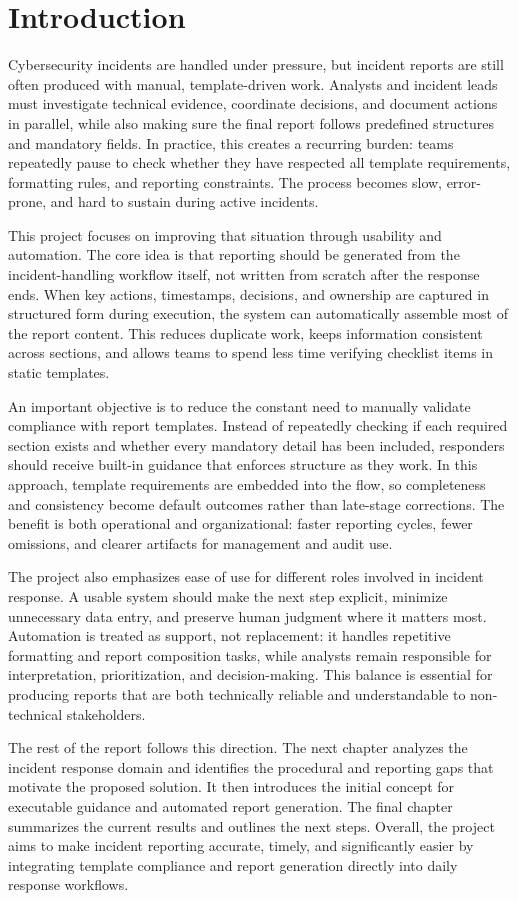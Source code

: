 \chapter*{Introduction}
{}

Cybersecurity incidents are handled under pressure, but incident reports are still often produced with manual, template-driven work. Analysts and incident leads must investigate technical evidence, coordinate decisions, and document actions in parallel, while also making sure the final report follows predefined structures and mandatory fields. In practice, this creates a recurring burden: teams repeatedly pause to check whether they have respected all template requirements, formatting rules, and reporting constraints. The process becomes slow, error-prone, and hard to sustain during active incidents.

This project focuses on improving that situation through usability and automation. The core idea is that reporting should be generated from the incident-handling workflow itself, not written from scratch after the response ends. When key actions, timestamps, decisions, and ownership are captured in structured form during execution, the system can automatically assemble most of the report content. This reduces duplicate work, keeps information consistent across sections, and allows teams to spend less time verifying checklist items in static templates.

An important objective is to reduce the constant need to manually validate compliance with report templates. Instead of repeatedly checking if each required section exists and whether every mandatory detail has been included, responders should receive built-in guidance that enforces structure as they work. In this approach, template requirements are embedded into the flow, so completeness and consistency become default outcomes rather than late-stage corrections. The benefit is both operational and organizational: faster reporting cycles, fewer omissions, and clearer artifacts for management and audit use.

The project also emphasizes ease of use for different roles involved in incident response. A usable system should make the next step explicit, minimize unnecessary data entry, and preserve human judgment where it matters most. Automation is treated as support, not replacement: it handles repetitive formatting and report composition tasks, while analysts remain responsible for interpretation, prioritization, and decision-making. This balance is essential for producing reports that are both technically reliable and understandable to non-technical stakeholders.

The rest of the report follows this direction. The next chapter analyzes the incident response domain and identifies the procedural and reporting gaps that motivate the proposed solution. It then introduces the initial concept for executable guidance and automated report generation. The final chapter summarizes the current results and outlines the next steps. Overall, the project aims to make incident reporting accurate, timely, and significantly easier by integrating template compliance and report generation directly into daily response workflows.
